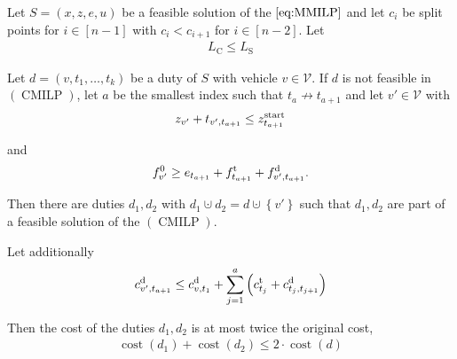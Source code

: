 \begin{lemma}
\label{lem:doubleduties}

Let $S=\left(x,z,e,u\right)$ be a feasible solution of the $\eqref{eq:MMILP}$ and let $c_i$ be split points for $i\in[n-1]$ with ${c_i<c_{i+1}}$ for ${i\in[n-2]}$. Let
\begin{align}
	L_{\operatorname{C}}\leq L_{\operatorname{S}}\label{eq:LCLS}
\end{align}

Let ${d=\left(v,t_1,\dots,t_k\right)}$ be a duty of $S$ with vehicle $v\in\mathcal{V}$. If $d$ is not feasible in $(\operatorname{CMILP})$, let $a$ be the smallest index such that ${t_a\not\to t_{a+1}}$ and let ${v'\in\mathcal{V}}$ with
\begin{align}
	z_{v'} + t_{v',t_{a+1}}\leq z^{\operatorname{start}}_{t_{a+1}}\label{eq:doubleduties:time}
\end{align}

and
\begin{align}
	f^0_{v'}\geq e_{t_{a+1}} + f^{\operatorname{t}}_{t_{a+1}} + f^{\operatorname{d}}_{v',t_{a+1}}.\label{eq:doubleduties:fuel}
\end{align}

Then there are duties $d_1,d_2$ with ${d_1\cupdot d_2=d\cupdot\left\{v'\right\}}$ such that $d_1,d_2$ are part of a feasible solution of the $(\operatorname{CMILP})$.

Let additionally
\begin{align}
	c^{\operatorname{d}}_{v',t_{a+1}}\leq c^{\operatorname{d}}_{v,t_1} + \sum_{j=1}^a \left(c^{\operatorname{t}}_{t_j} + c^{\operatorname{d}}_{t_j,t_{j+1}}\right) \label{eq:doubleduties:cost}
\end{align}

Then the cost of the duties $d_1,d_2$ is at most twice the original cost, \ie
\begin{align*}
	\operatorname{cost}\left(d_1\right) + \operatorname{cost}\left(d_2\right) \leq 2\cdot\operatorname{cost}\left(d\right)
\end{align*}

\end{lemma}

